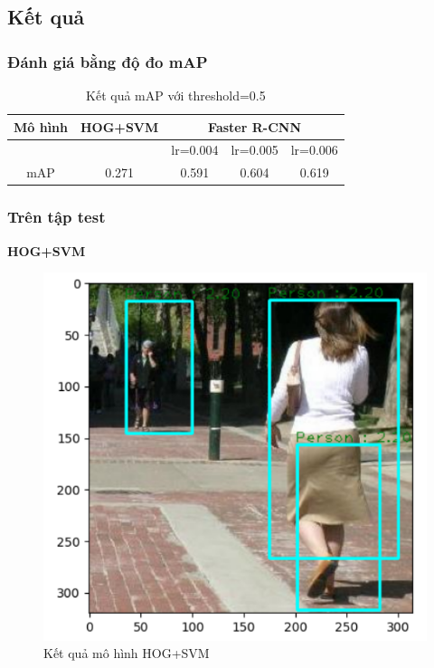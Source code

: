 \subsection{Kết quả}
\subsubsection{Đánh giá bằng độ đo mAP}
\begin{table}[ht]
   \begin{center}
    \caption{Kết quả mAP với threshold=0.5}
    \begin{tabular}{c | c | *3c}
    \toprule
    Mô hình &  HOG+SVM  & \multicolumn{3}{c}{Faster R-CNN}\\
    \hline
    {}   &             & lr=0.004  & lr=0.005 & lr=0.006\\
    mAP   &      0.271      & 0.591  & 0.604 & 0.619\\
    \bottomrule
    \end{tabular}
  \end{center}
\end{table}
\subsubsection{Trên tập test}
\textbf{HOG+SVM}\\

\begin{figure}[h!]
  \centering
  \includegraphics[scale=0.7]{graphics/testhogsvm.png}
  \caption{Kết quả mô hình HOG+SVM}
\end{figure}


